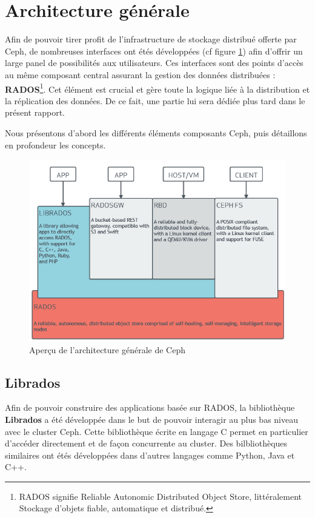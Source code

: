 \section{Architecture générale}

Afin de pouvoir tirer profit de l’infrastructure de stockage distribué offerte par Ceph, de nombreuses interfaces ont étés développées (cf figure \ref{chap2:stack}) afin d'offrir un large panel de possibilités aux utilisateurs. Ces interfaces sont des points d'accès au même composant central assurant la gestion des données distribuées : \textbf{RADOS}\footnote{RADOS signifie Reliable Autonomic Distributed Object Store, littéralement Stockage d'objets fiable, automatique et distribué.}. Cet élément est crucial et gère toute la logique liée à la distribution et la réplication des données. De ce fait, une partie lui sera dédiée plus tard dans le présent rapport. 

Nous présentons d'abord les différents éléments composants Ceph, puis détaillons en profondeur les concepts.

\begin{figure}[h]
    \centering
    \includegraphics[scale=0.5]{./images/stack.png}
    \caption{Aperçu de l'architecture générale de Ceph}
    \label{chap2:stack}
\end{figure}

\subsection{Librados}
Afin de pouvoir construire des applications basée sur RADOS, la bibliothèque \textbf{Librados} a été développée dans le but de pouvoir interagir au plus bas niveau avec le cluster Ceph. Cette bibliothèque écrite en langage C permet en particulier d'accéder directement et de façon concurrente au cluster. Des bilbliothèques similaires ont étés développées dans d'autres langages comme Python, Java et C++. 

